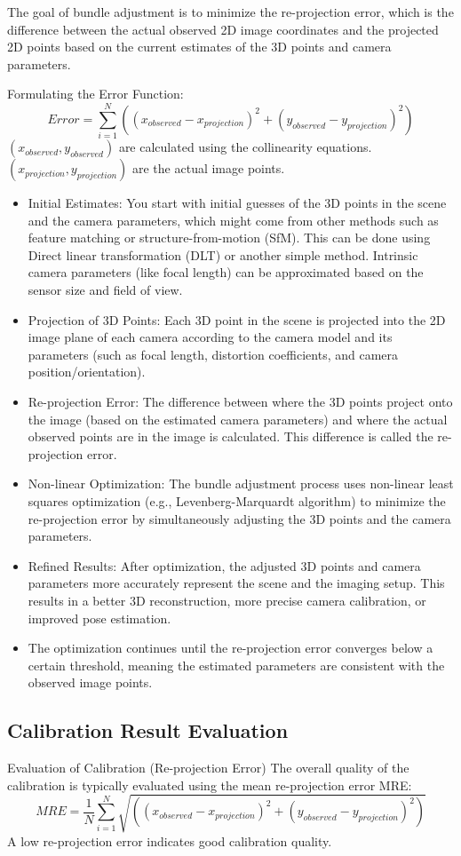 The goal of bundle adjustment is to minimize the re-projection error, which is the difference between the actual observed 2D image coordinates and the projected 2D points based on the current estimates of the 3D points and camera parameters.


Formulating the Error Function:
\[
Error = \sum_{i=1}^N ((x_{observed} - x_{projection})^2 + (y_{observed} - y_{projection})^2)
\]
$(x_{observed}, y_{observed})$ are calculated using the collinearity equations. $(x_{projection}, y_{projection})$ are the actual image points.

\begin{itemize}
    \item Initial Estimates: You start with initial guesses of the 3D points in the scene and the camera parameters, which might come from other methods such as feature matching or structure-from-motion (SfM). This can be done using Direct linear transformation (DLT) or another simple method. Intrinsic camera parameters (like focal length) can be approximated based on the sensor size and field of view.
    \item Projection of 3D Points: Each 3D point in the scene is projected into the 2D image plane of each camera according to the camera model and its parameters (such as focal length, distortion coefficients, and camera position/orientation).
    \item Re-projection Error: The difference between where the 3D points project onto the image (based on the estimated camera parameters) and where the actual observed points are in the image is calculated. This difference is called the re-projection error.
    \item Non-linear Optimization: The bundle adjustment process uses non-linear least squares optimization (e.g., Levenberg-Marquardt algorithm) to minimize the re-projection error by simultaneously adjusting the 3D points and the camera parameters.
    \item Refined Results: After optimization, the adjusted 3D points and camera parameters more accurately represent the scene and the imaging setup. This results in a better 3D reconstruction, more precise camera calibration, or improved pose estimation.
    \item The optimization continues until the re-projection error converges below a certain threshold, meaning the estimated parameters are consistent with the observed image points.
\end{itemize}




\subsection{Calibration Result Evaluation}
Evaluation of Calibration (Re-projection Error)
The overall quality of the calibration is typically evaluated using the mean re-projection error MRE:
\[
MRE = \frac{1}{N} \sum_{i=1}^N \sqrt{((x_{observed} - x_{projection})^2 + (y_{observed} - y_{projection})^2)}
\]
A low re-projection error indicates good calibration quality.


\clearpage
\printbibliography[heading=subbibliography, title=\bibname\ for \chaptername~\thechapter]